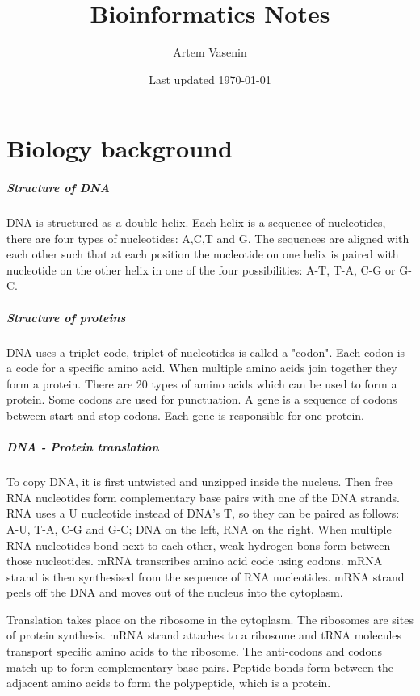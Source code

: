 \documentclass{report}
\title{Bioinformatics Notes}
\author{Artem Vasenin}
\date{Last updated \today}
\begin{document}
\maketitle
\cleardoublepage
{}
\tableofcontents
\cleardoublepage
{}

\chapter{Biology background}
\paragraph{Structure of DNA}
DNA is structured as a double helix.
Each helix is a sequence of nucleotides, there are four types of nucleotides: A,C,T and G.
The sequences are aligned with each other such that at each position the nucleotide on one helix is paired with nucleotide on the other helix in one of the four possibilities: A-T, T-A, C-G or G-C.
\paragraph{Structure of proteins}
DNA uses a triplet code, triplet of nucleotides is called a "codon".
Each codon is a code for a specific amino acid.
When multiple amino acids join together they form a protein.
There are 20 types of amino acids which can be used to form a protein.
Some codons are used for punctuation.
A gene is a sequence of codons between start and stop codons.
Each gene is responsible for one protein.
\paragraph{DNA - Protein translation}
To copy DNA, it is first untwisted and unzipped inside the nucleus.
Then free RNA nucleotides form complementary base pairs with one of the DNA strands.
RNA uses a U nucleotide instead of DNA's T, so they can be paired as follows: A-U, T-A, C-G and G-C; DNA on the left, RNA on the right.
When multiple RNA nucleotides bond next to each other, weak hydrogen bons form between those nucleotides.
mRNA transcribes amino acid code using codons.
mRNA strand is then synthesised from the sequence of RNA nucleotides.
mRNA strand peels off the DNA and moves out of the nucleus into the cytoplasm.

Translation takes place on the ribosome in the cytoplasm.
The ribosomes are sites of protein synthesis.
mRNA strand attaches to a ribosome and tRNA molecules transport specific amino acids to the ribosome.
The anti-codons and codons match up to form complementary base pairs.
Peptide bonds form between the adjacent amino acids to form the polypeptide, which is a protein.
\end{document}
